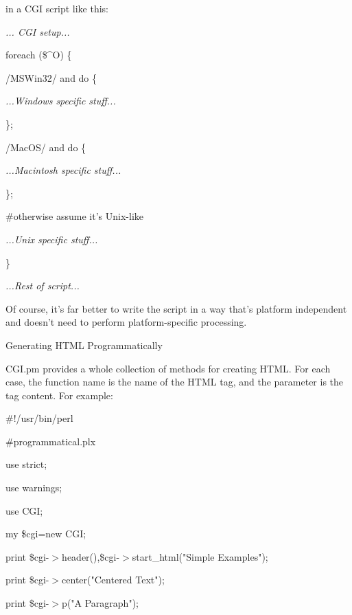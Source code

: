 \documentclass[a4paper,11pt]{book}
\begin{document}
\noindent in a CGI script like this:

\noindent 

\noindent \textit{... CGI setup...}

\noindent foreach (\$\^{}O) \{

\noindent /MSWin32/ and do \{

\noindent \textit{...Windows specific stuff...}

\noindent \};

\noindent /MacOS/ and do \{

\noindent \textit{...Macintosh specific stuff...}

\noindent \};

\noindent \#otherwise assume it's Unix-like

\noindent \textit{...Unix specific stuff...}

\noindent \}

\noindent \textit{...Rest of script...}

\noindent 

\noindent Of course, it's far better to write the script in a way that's platform independent and doesn't need to perform platform-specific processing.

\noindent 

\noindent Generating HTML Programmatically

\noindent 

\noindent CGI.pm provides a whole collection of methods for creating HTML. For each case, the function name is the name of the HTML tag, and the parameter is the tag content. For example:

\noindent 

\noindent \#!/usr/bin/perl

\noindent \#programmatical.plx

\noindent use strict;

\noindent use warnings;

\noindent use CGI;

\noindent 

\noindent my \$cgi=new CGI;

\noindent 

\noindent print \$cgi-$>$header(),\$cgi-$>$start\_html("Simple Examples");

\noindent 

\noindent 

\noindent print \$cgi-$>$center("Centered Text");

\noindent print \$cgi-$>$p("A Paragraph");
\end{document}
